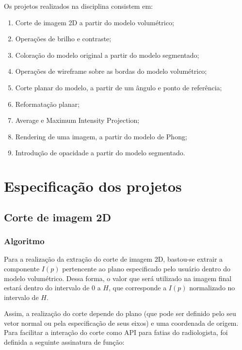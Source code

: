 Os projetos realizados na disciplina consistem em: 

  \begin{enumerate}
    \item Corte de imagem 2D a partir do modelo volumétrico;
    \item Operações de brilho e contraste;
    \item Coloração do modelo original a partir do modelo segmentado;

    \bigskip

    \item Operações de wireframe sobre as bordas do modelo volumétrico;
    \item Corte planar do modelo, a partir de um ângulo e ponto de referência;
    \item Reformatação planar;
    \item Average e Maximum Intensity Projection;

    \bigskip

    \item Rendering de uma imagem, a partir do modelo de Phong;
    \item Introdução de opacidade a partir do modelo segmentado.

  \end{enumerate}



\section{Especificação dos projetos} \label{sec:int}
    \subsection{Corte de imagem 2D}
        \subsubsection{Algoritmo}
            Para a realização da extração do corte de imagem 2D, bastou-se extrair a componente $I(p)$ pertencente ao plano especificado pelo usuário dentro do modelo volumétrico. Dessa forma, o valor que será utilizado na imagem final estará dentro do intervalo de $0$ a $H$, que corresponde a $I(p)$ normalizado no intervalo de $H$.

            Assim, a realização do corte depende do plano (que pode ser definido pelo seu vetor normal ou pela especificação de seus eixos) e uma coordenada de origem. Para facilitar a interação do corte como API para fatias do radiologista, foi definida a seguinte assinatura de função: \\

